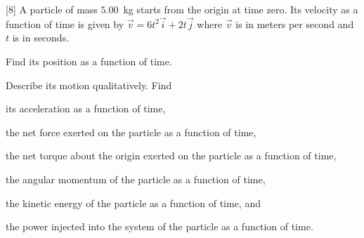 \begin{problem}
	\correct{6.5cm}[8]%
	A particle of mass $5.00$~kg starts from the origin at time zero. Its velocity as a function of time is given by $\vec v = 6t^2 \vec i + 2t \vec j$ where $\vec v$ is in meters per second and $t$ is in seconds. 
	\begin{enumerate*}[label=(\alph*)]
		\item Find its position as a function of time. 
		\item  Describe its motion qualitatively.
		Find
		\item its acceleration as a function of time,
		\item the net force exerted on the particle as a function of time,
		\item the net torque about the origin exerted on the particle as a function of time,
		\item the angular momentum of the particle as a function of time,
		\item the kinetic energy of the particle as a function of time, 
		and
		\item the power injected into the system of the particle as a function of time.
	\end{enumerate*}
\end{problem}



